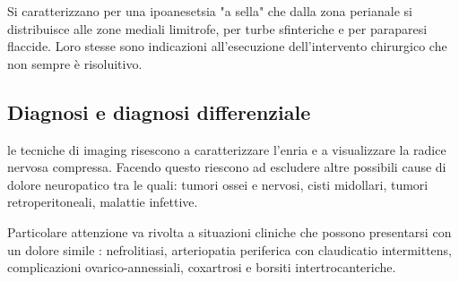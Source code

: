 Si caratterizzano per una ipoanesetsia "a sella" che dalla zona perianale si distribuisce alle zone mediali limitrofe, per turbe sfinteriche e per paraparesi flaccide. Loro stesse sono indicazioni all'esecuzione dell'intervento chirurgico che non sempre è risoluitivo.

\subsection{Diagnosi e diagnosi differenziale}

le tecniche di imaging risescono a caratterizzare l'enria e a visualizzare la radice nervosa compressa. Facendo questo riescono ad escludere altre possibili cause di dolore neuropatico tra le quali:
tumori ossei e nervosi, cisti midollari, tumori retroperitoneali, malattie infettive.

Particolare attenzione va rivolta a situazioni cliniche che possono presentarsi con un dolore simile : nefrolitiasi, arteriopatia periferica con claudicatio intermittens, complicazioni ovarico-annessiali,
coxartrosi e borsiti intertrocanteriche.
